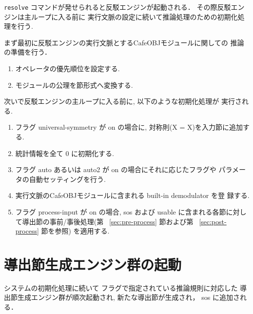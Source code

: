 \texttt{resolve} コマンドが発せられると反駁エンジンが起動される．
その際反駁エンジンは主ループに入る前に
実行文脈の設定に続いて推論処理のための初期化処理を行う.

まず最初に反駁エンジンの実行文脈とするCafeOBJモジュールに関しての
推論の準備を行う．
\begin{enumerate}
\item オペレータの優先順位を設定する.
\item モジュールの公理を節形式へ変換する.
\end{enumerate}

次いで反駁エンジンの主ループに入る前に, 以下のような初期化処理が
実行される.

\begin{enumerate}
\item フラグ universal-symmetry が on の場合に, 
  対称則(X = X)を入力節に追加する.
\item 統計情報を全て 0 に初期化する.
\item フラグ auto あるいは auto2 が on の場合にそれに応じたフラグや
  パラメータの自動セッティングを行う.
\item 実行文脈のCafeOBJモジュールに含まれる built-in demodulator を登
  録する. 
\item フラグ process-input が on の場合, sos および usable 
  に含まれる各節に対して導出節の事前/事後処理(第 ~\ref{sec:pre-process}
  節および第 ~\ref{sec:post-process} 節を参照) を適用する.
\end{enumerate}

\section{導出節生成エンジン群の起動}
\label{sec:infer}

システムの初期化処理に続いて
フラグで指定されている推論規則に対応した
導出節生成エンジン群が順次起動され, 新たな導出節が生成され，
sos に追加される．

